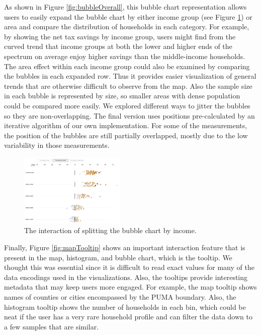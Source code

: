 \documentclass{sigchi}
\begin{document}
As shown in Figure \ref{fig:bubbleOverall}, this bubble chart representation allows users to easily expand the bubble chart by either income group (see Figure \ref{fig:bubbleIncome}) or area and compare the distribution of households in each category. For example, by showing the net tax savings by income group, users might find from the curved trend that income groups at both the lower and higher ends of the spectrum on average enjoy higher savings than the middle-income households. The area effect within each income group could also be examined by comparing the bubbles in each expanded row. Thus it provides easier visualization of general trends that are otherwise difficult to observe from the map. Also the sample size in each bubble is represented by size, so smaller areas with dense population could be compared more easily. We explored different ways to jitter the bubbles so they are non-overlapping. The final version uses positions pre-calculated by an iterative algorithm of our own implementation. For some of the measurements, the position of the bubbles are still partially overlapped, mostly due to the low variability in those measurements.  

\begin{figure}
\centering
\includegraphics[width=0.45\textwidth]{bubbleIncome}
\caption{The interaction of splitting the bubble chart by income. }
\label{fig:bubbleIncome}
\end{figure}

Finally, Figure \ref{fig:mapTooltip} shows an important interaction feature that is present in the map, histogram, and bubble chart, which is the tooltip. We thought this was essential since it is difficult to read exact values for many of the data encodings used in the visualizations. Also, the tooltips provide interesting metadata that may keep users more engaged. For example, the map tooltip shows names of counties or cities encompassed by the PUMA boundary. Also, the histogram tooltip shows the number of households in each bin, which could be neat if the user has a very rare household profile and can filter the data down to a few samples that are similar. 
\end{document}
